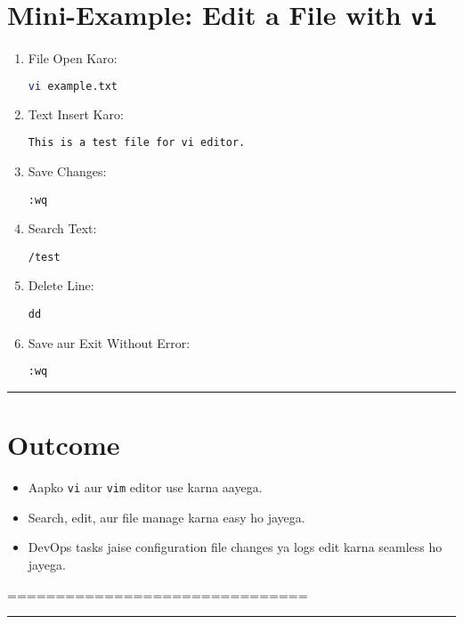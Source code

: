 \documentclass[a4paper,12pt]{article}
\begin{document}
\section*{Mini-Example: Edit a File with \texttt{vi}}
\begin{enumerate}
    \item File Open Karo:
\begin{lstlisting}[language=bash]
vi example.txt
\end{lstlisting}
    \item Text Insert Karo:
    \begin{lstlisting}
This is a test file for vi editor.
\end{lstlisting}
    \item Save Changes:
\begin{lstlisting}
:wq
\end{lstlisting}
    \item Search Text:
\begin{lstlisting}
/test
\end{lstlisting}
    \item Delete Line:
\begin{lstlisting}
dd
\end{lstlisting}
    \item Save aur Exit Without Error:
\begin{lstlisting}
:wq
\end{lstlisting}
\end{enumerate}

\hrule

\section*{Outcome}
\begin{itemize}
    \item Aapko \texttt{vi} aur \texttt{vim} editor use karna aayega.
    \item Search, edit, aur file manage karna easy ho jayega.
    \item DevOps tasks jaise configuration file changes ya logs edit karna seamless ho jayega.
\end{itemize}

===============================
\hrule



\sectionfont{\color{headingcolor}\Huge\bfseries}
\subsectionfont{\color{subheadingcolor}\LARGE\bfseries}
\subsubsectionfont{\color{black}\Large\bfseries}
\end{document}
